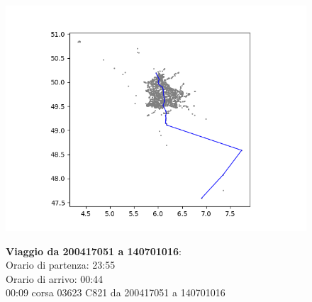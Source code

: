 \documentclass{article}
\begin{document}
\begin{figure}[H]
	\begin{minipage}{0.55\linewidth}
		\centering
		\hspace*{-3cm}\includegraphics[width=1.0\linewidth, valign=t]{figures/Figure_1}
	\end{minipage}
	\hspace*{-2cm}\begin{minipage}{0.7\linewidth}
		\textbf{Viaggio da 200417051 a 140701016}:\\
		Orario di partenza: 23:55\\
		Orario di arrivo: 00:44\\
		00:09 corsa 03623 C821 da 200417051 a 140701016
		
	\end{minipage}
\end{figure}
\end{document}
